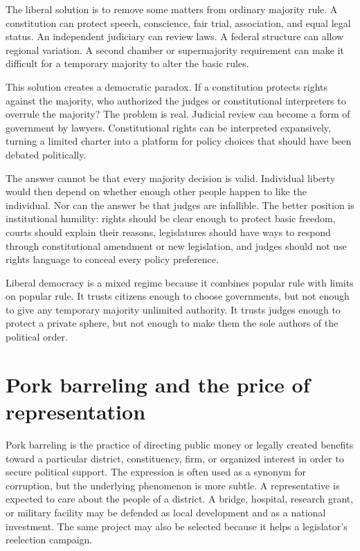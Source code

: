 ﻿\documentclass[12pt,a4paper]{book}
\begin{document}
The liberal solution is to remove some matters from ordinary majority rule.
A constitution can protect speech, conscience, fair trial, association, and
equal legal status.  An independent judiciary can review laws.  A federal
structure can allow regional variation.  A second chamber or supermajority
requirement can make it difficult for a temporary majority to alter the
basic rules.

This solution creates a democratic paradox.  If a constitution protects
rights against the majority, who authorized the judges or constitutional
interpreters to overrule the majority?  The problem is real.  Judicial
review can become a form of government by lawyers.  Constitutional rights
can be interpreted expansively, turning a limited charter into a platform
for policy choices that should have been debated politically.

The answer cannot be that every majority decision is valid.  Individual
liberty would then depend on whether enough other people happen to like the
individual.  Nor can the answer be that judges are infallible.  The better
position is institutional humility: rights should be clear enough to protect
basic freedom, courts should explain their reasons, legislatures should have
ways to respond through constitutional amendment or new legislation, and
judges should not use rights language to conceal every policy preference.

Liberal democracy is a mixed regime because it combines popular rule with
limits on popular rule.  It trusts citizens enough to choose governments,
but not enough to give any temporary majority unlimited authority.  It
trusts judges enough to protect a private sphere, but not enough to make them
the sole authors of the political order.

\section{Pork barreling and the price of representation}

Pork barreling is the practice of directing public money or legally created
benefits toward a particular district, constituency, firm, or organized
interest in order to secure political support.  The expression is often used
as a synonym for corruption, but the underlying phenomenon is more subtle.
A representative is expected to care about the people of a district.  A
bridge, hospital, research grant, or military facility may be defended as
local development and as a national investment.  The same project may also
be selected because it helps a legislator's reelection campaign.
\end{document}
